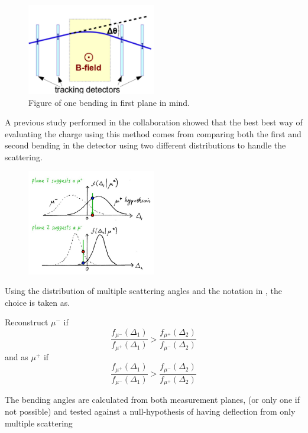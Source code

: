 \begin{figure}[h!]
\centering
\includegraphics[width=0.5\textwidth]{figures/lowP/scattering.jpeg}
\caption{Figure of one bending in first plane in mind.}
\label{fig:Scattering}
\end{figure}

A previous study performed in the collaboration showed that the best best way of evaluating the charge using this method comes from comparing both the first and second bending in the detector using two different distributions to handle the scattering.

\begin{figure}[h!]
\centering
\includegraphics[width=0.5\textwidth]{figures/lowP/null.jpg}
\caption{}
\label{fig:NullHyp}
\end{figure}

Using the distribution of multiple scattering angles and the notation in , the choice is taken as. 

Reconstruct $\mu^-$ if 
\begin{equation}
\frac{f_{\mu^-}(\Delta_1)}{f_{\mu^+}(\Delta_1)} > \frac{f_{\mu^+}(\Delta_2)}{f_{\mu^-}(\Delta_2)}
\end{equation}
and as $\mu^+$ if
\begin{equation}
\frac{f_{\mu^+}(\Delta_1)}{f_{\mu^-}(\Delta_1)} > \frac{f_{\mu^-}(\Delta_2)}{f_{\mu^+}(\Delta_2)}
\end{equation}

The bending angles are calculated from both measurement planes, (or only one if not possible) and tested against a null-hypothesis of having deflection from only multiple scattering 


